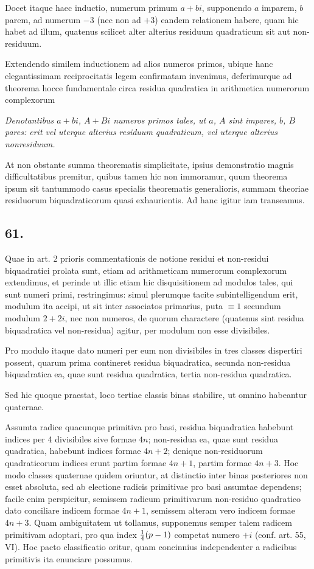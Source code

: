 \documentclass[twoside,12pt, showframe]{memoir}
\let\oldfrac\frac
\def\frac#1#2{\mathchoice{\tfrac{#1}{#2}}{\oldfrac{#1}{#2}}{\genfrac{}{}{}{2}{#1}{#2\mathstrut}}{\genfrac{}{}{}{3}{#1}{#2\mathstrut}}}
\begin{document}
Docet itaque haec inductio, numerum primum \(a+b i\), supponendo \(a\) imparem, \(b\) parem, ad numerum \(-3\) (nec non ad \(+3\)) eandem relationem habere, quam hic habet ad illum, quatenus scilicet alter alterius residuum quadraticum sit aut non-residuum.

Extendendo similem inductionem ad alios numeros primos, ubique hanc elegantissimam reciprocitatis legem confirmatam invenimus, deferimurque ad theorema hocce fundamentale circa residua quadratica in arithmetica numerorum complexorum
 
\textit{Denotantibus \(a+b i\), \( A+B i\) numeros primos tales, ut \(a\), \(A\) sint impares, \(b\), \( B\) pares: erit vel uterque alterius residuum quadraticum, vel uterque alterius nonresiduum.}
 
At non obstante summa theorematis simplicitate, ipsius demonstratio magnis difficultatibus premitur, quibus tamen hic non immoramur, quum theorema ipsum sit tantummodo casus specialis theorematis generalioris, summam theoriae residuorum biquadraticorum quasi exhaurientis. Ad hanc igitur iam transeamus.

\subsection*{61.}
 
Quae in art. 2 prioris commentationis de notione residui et non-residui biquadratici prolata sunt, etiam ad arithmeticam numerorum complexorum extendimus, et perinde ut illic etiam hic disquisitionem ad modulos tales, qui sunt numeri primi, restringimus: simul plerumque tacite subintelligendum erit, modulum ita accipi, ut sit inter associatos primarius, puta \(\equiv 1\) secundum modulum \(2+2 i\), nec non numeros, de quorum charactere (quatenus sint residua biquadratica vel non-residua) agitur, per modulum non esse divisibiles.
 
Pro modulo itaque dato numeri per eum non divisibiles in tres classes dispertiri possent, quarum prima contineret residua biquadratica, secunda non-residua biquadratica ea, quae sunt residua quadratica, tertia non-residua quadratica.\clearpage\noindent%

Sed hic quoque praestat, loco tertiae classis binas stabilire, ut omnino habeantur quaternae.
 
Assumta radice quacunque primitiva pro basi, residua biquadratica habebunt indices per 4 divisibiles sive formae \(4 n\); non-residua ea, quae sunt residua quadratica, habebunt indices formae \(4 n+2\); denique non-residuorum quadraticorum indices erunt partim formae \(4 n+1\), partim formae \(4 n+3\). Hoc modo classes quaternae quidem oriuntur, at distinctio inter binas posteriores non esset absoluta, sed ab electione radicis primitivae pro basi assumtae dependens; facile enim perspicitur, semissem radicum primitivarum non-residuo quadratico dato conciliare indicem formae \(4 n+1\), semissem alteram vero indicem formae \(4 n+3\). Quam ambiguitatem ut tollamus, supponemus semper talem radicem primitivam adoptari, pro qua index \(\frac{1}{4}(p-1)\) competat numero \(+i\) (conf. art. 55, VI). Hoc pacto classificatio oritur, quam concinnius independenter a radicibus primitivis ita enunciare possumus.
 
\end{document}
